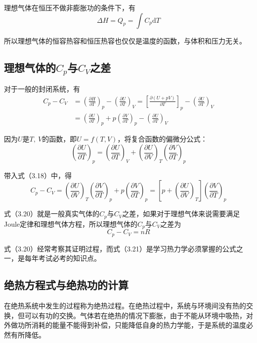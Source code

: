 \documentclass[lang=cn,newtx,11pt,scheme=chinese]{elegantbook}
\begin{document}
理想气体在恒压不做非膨胀功的条件下，有
\begin{equation}
	\Delta H=Q_p=\int C_p \mathrm{d}T
\end{equation}

所以理想气体的恒容热容和恒压热容也仅仅是温度的函数，与体积和压力无关。

\subsection{理想气体的$C_p$与$C_V$之差}
对于一般的封闭系统，有
\begin{equation}
	\begin{aligned}
		C_p-C_V &= \left ( \frac{\partial H}{\partial T}  \right )_p- \left ( \frac{\partial U}{\partial T}  \right )_V=\left [ \frac{\partial (U+pV)}{\partial T}  \right ]_p- \left ( \frac{\partial U}{\partial T}  \right )_V \\[1.5ex]
		&= \left ( \frac{\partial U}{\partial T}  \right )_p+p\left ( \frac{\partial V}{\partial T}  \right )_p-\left ( \frac{\partial U}{\partial T}  \right )_V
	\end{aligned}
\end{equation}

因为$U$是$T, \ V$的函数，即$U=f(T,V)$，将复合函数的偏微分公式：
\begin{equation}
	\left ( \frac{\partial U}{\partial T}  \right )_p = \left ( \frac{\partial U}{\partial T}  \right )_V+\left ( \frac{\partial U}{\partial V}  \right )_T \left ( \frac{\partial V}{\partial T}  \right )_p
\end{equation}

带入式（3.18）中，得
\begin{equation}
	C_p-C_V= \left ( \frac{\partial U}{\partial V}  \right )_T \left ( \frac{\partial V}{\partial T}  \right )_p+p\left ( \frac{\partial V}{\partial T}  \right )_p=\left [ p+\left ( \frac{\partial U}{\partial V}  \right )_T \right ] \left ( \frac{\partial V}{\partial T}  \right )_p
\end{equation}

式（3.20）就是一般真实气体的$C_p$与$C_V$之差，如果对于理想气体来说需要满足Joule定律和理想气体方程，所以理想气体的$C_p$与$C_V$之差为
\begin{equation}
	C_p-C_V=nR
\end{equation}

式（3.20）经常考察其证明过程，而式（3.21）是学习热力学必须掌握的公式之一，是每年考试必考的知识点。

\subsection{绝热方程式与绝热功的计算}
在绝热系统中发生的过程称为绝热过程。在绝热过程中，系统与环境间没有热的交换，但可以有功的交换。气体若在绝热的情况下膨胀，由于不能从环境中吸热，对外做功所消耗的能量不能得到补偿，只能降低自身的热力学能，于是系统的温度必然有所降低。
\end{document}
